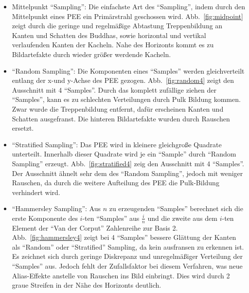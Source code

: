 \begin{itemize}
    \item Mittelpunkt "`Sampling"': Die einfachste Art des "`Sampling"', indem durch den Mittelpunkt eines PEE ein Primärstrahl geschossen wird. Abb.~\ref{fig:midpoint} zeigt durch die geringe und regelmäßige Abtastung Treppenbildung an Kanten und Schatten des Buddhas, sowie horizontal und vertikal verlaufenden Kanten der Kacheln. Nahe des Horizonts kommt es zu Bildartefakte durch wieder größer werdende Kacheln.
    
    \item "`Random Sampling"': Die Komponenten eines "`Samples"' werden gleichverteilt entlang der x-und y-Achse des PEE gezogen. Abb.~\ref{fig:random4} zeigt den Ausschnitt mit 4 "`Samples"'. Durch das komplett zufällige ziehen der "`Samples"', kann es zu schlechten Verteilungen durch Pulk Bildung kommen. Zwar wurde die Treppenbildung entfernt, dafür erscheinen Kanten und Schatten ausgefranst. Die hinteren Bildartefakte wurden durch Rauschen ersetzt.
    
    \item "`Stratified Sampling"': Das PEE wird in kleinere gleichgroße Quadrate unterteilt. Innerhalb dieser Quadrate wird je ein "`Sample"' durch "`Random Sampling"' erzeugt. Abb.~\ref{fig:stratified4} zeig den Ausschnitt mit 4 "`Samples"'. Der Ausschnitt ähnelt sehr dem des "`Random Sampling"', jedoch mit weniger Rauschen, da durch die weitere Aufteilung des PEE die Pulk-Bildung verhindert wird.
    
    \item "`Hammersley Sampling"': Aus \( n \) zu erzeugenden "`Samples"' berechnet sich die erste Komponente des \( i \)-ten "`Samples"' aus \( \frac{i}{n} \) und die zweite aus dem \( i \)-ten Element der "`Van der Corput"' Zahlenreihe zur Basis 2. Abb.~\ref{fig:hammersley4} zeigt bei 4 "`Samples"' bessere Glättung der Kanten als "`Random"' oder "`Stratified"' Sampling, da kein ausfransen zu erkennen ist. Es zeichnet sich durch geringe Diskrepanz und unregelmäßiger Verteilung der "`Samples"' aus. Jedoch fehlt der Zufallsfaktor bei diesem Verfahren, was neue Alias-Effekte anstelle von Rauschen ins Bild einbringt. Dies wird durch 2 graue Streifen in der Nähe des Horizonts deutlich.
    
   
\end{itemize}


\newpage

